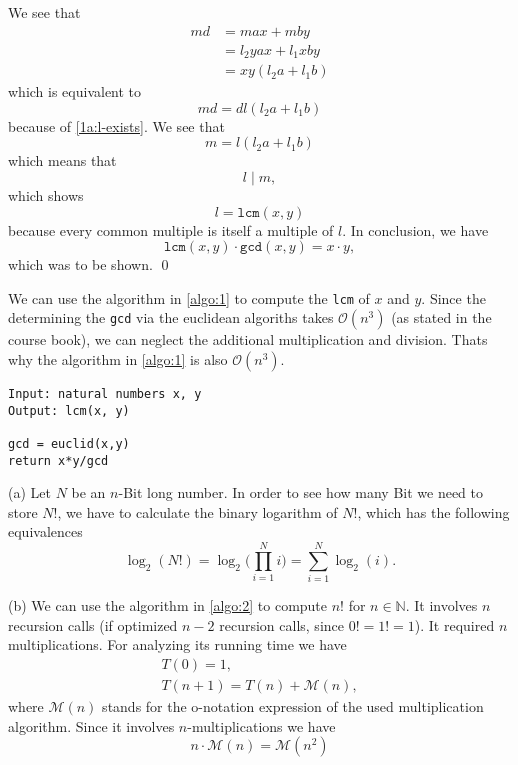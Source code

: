 \documentclass[12pt]{article}
\begin{document}
\begin{equation}
 \end{equation} We see that \begin{align}
 	md&=max+mby\\
 	&=l_2yax+l_1xby\\
 	&=xy(l_2a+l_1b)	
 \end{align} which is equivalent to \begin{equation}
 	md=dl(l_2a+l_1b)
 \end{equation} because of \autoref{1a:l-exists}. We see that \begin{equation}
 	m=l(l_2a+l_1b)
 \end{equation} which means that \begin{equation}
 	l\mid m,
 \end{equation} which shows \begin{equation}
 	l=\texttt{lcm}(x,y)
 \end{equation} because every common multiple is itself a multiple of $l$. In conclusion, we have \begin{equation}
 	\texttt{lcm}(x,y)\cdot\texttt{gcd}(x,y)=x\cdot y,
 \end{equation} which was to be shown. \qed
 
 We can use the algorithm in \autoref{algo:1} to compute the \texttt{lcm} of $x$ and $y$. Since the determining the \texttt{gcd} via the euclidean algoriths takes $\mathcal{O}(n^3)$ (as stated in the course book), we can neglect the additional multiplication and division. Thats why the algorithm in \autoref{algo:1} is also $\mathcal{O}(n^3)$.
 
 \begin{lstlisting}[caption={Algorithm to compute \texttt{lcm}(x,y)},label={algo:1}]
Input: natural numbers x, y
Output: lcm(x, y)

gcd = euclid(x,y)
return x*y/gcd
 \end{lstlisting}
 
 
  (a) Let $N$ be an $n$-Bit long number. In order to see how many Bit we need to store $N!$, we have to calculate the binary logarithm of $N!$, which has the following equivalences \begin{equation}
 	\log_2(N!)= \log_2\bigg(\prod_{i=1}^{N}i\bigg) = \sum_{i=1}^N \log_2(i).
 \end{equation}
 
 (b) We can use the algorithm in \autoref{algo:2} to compute $n!$ for $n\in\mathbb{N}$. It involves $n$ recursion calls (if optimized $n-2$ recursion calls, since $0!=1!=1$). It required $n$ multiplications. For analyzing its running time we have \begin{gather}
 	T(0)=1, \\
 	T(n+1)=T(n)+\mathcal{M}(n),
 \end{gather} where $\mathcal{M}(n)$ stands for the o-notation expression of the used multiplication algorithm. Since it involves $n$-multiplications we have \begin{equation}
 	n\cdot\mathcal{M}(n)=\mathcal{M}(n^2)
 \end{equation}
 
\end{document}
